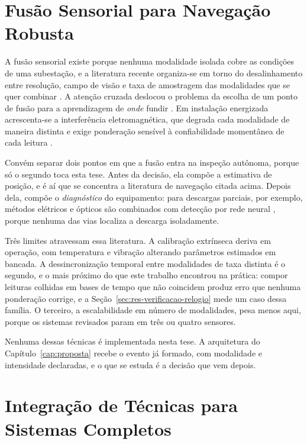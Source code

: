 \section{Fusão Sensorial para Navegação Robusta}

A fusão sensorial existe porque nenhuma modalidade isolada cobre as condições de uma
subestação, e a literatura recente organiza-se em torno do desalinhamento entre
resolução, campo de visão e taxa de amostragem das modalidades que se quer combinar
\cite{Chen2017, Jaritz2019}. A atenção cruzada deslocou o problema da escolha de um ponto
de fusão para a aprendizagem de \emph{onde} fundir \cite{Prakash2021}. Em instalação
energizada acrescenta-se a interferência eletromagnética, que degrada cada modalidade de
maneira distinta e exige ponderação sensível à confiabilidade momentânea de cada leitura
\cite{Yan2024CombinedNav, Alatise2020Review}.

Convém separar dois pontos em que a fusão entra na inspeção autônoma, porque só o segundo
toca esta tese. Antes da decisão, ela compõe a estimativa de posição, e é aí que se
concentra a literatura de navegação citada acima. Depois dela, compõe o \emph{diagnóstico}
do equipamento: para descargas parciais, por exemplo, métodos elétricos e ópticos são
combinados com detecção por rede neural \cite{Monzon2025PartialDischarge}, porque nenhuma
das vias localiza a descarga isoladamente.

Três limites atravessam essa literatura. A calibração extrínseca deriva em operação, com
temperatura e vibração alterando parâmetros estimados em bancada. A dessincronização
temporal entre modalidades de taxa distinta é o segundo, e o mais próximo do que este
trabalho encontrou na prática: compor leituras colhidas em bases de tempo que não
coincidem produz erro que nenhuma ponderação corrige, e a Seção~\ref{sec:res-verificacao-relogio}
mede um caso dessa família. O terceiro, a escalabilidade em número de modalidades, pesa
menos aqui, porque os sistemas revisados param em três ou quatro sensores.

Nenhuma dessas técnicas é implementada nesta tese. A arquitetura do
Capítulo~\ref{cap:proposta} recebe o evento já formado, com modalidade e intensidade
declaradas, e o que se estuda é a decisão que vem depois.
\section{Integração de Técnicas para Sistemas Completos}
\label{sec:rev-integracao}

